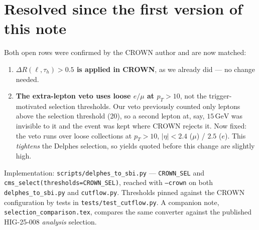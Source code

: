 \documentclass[11pt,a4paper]{article}
\newcommand{\tauh}{\tau_{h}}
\newcommand{\pt}{p_{T}}
\begin{document}
\section{Resolved since the first version of this note}

Both open rows were confirmed by the CROWN author and are now matched:

\begin{enumerate}\itemsep2pt
\item \textbf{$\Delta R(\ell,\tauh)>0.5$ is applied in CROWN}, as we already did ---
  no change needed.
\item \textbf{The extra-lepton veto uses loose $e/\mu$ at $\pt>10$}, not the
  trigger-motivated selection thresholds. Our veto previously counted only leptons above
  the selection threshold (20), so a second lepton at, say, $15\,\si{\GeV}$ was
  invisible to it and the event was kept where CROWN rejects it. Now fixed: the veto
  runs over loose collections at $\pt>10$, $|\eta|<2.4$ ($\mu$) / $2.5$ ($e$). This
  \emph{tightens} the Delphes selection, so yields quoted before this change are
  slightly high.
\end{enumerate}

\vspace{0.4cm}
\noindent\footnotesize
Implementation: \texttt{scripts/delphes\_to\_sbi.py} --- \texttt{CROWN\_SEL} and
\texttt{cms\_select(thresholds=CROWN\_SEL)}, reached with \texttt{--crown} on both
\texttt{delphes\_to\_sbi.py} and \texttt{cutflow.py}. Thresholds pinned against the
CROWN configuration by tests in \texttt{tests/test\_cutflow.py}. A companion note,
\texttt{selection\_comparison.tex}, compares the same converter against the published
HIG-25-008 \emph{analysis} selection.
\end{document}
